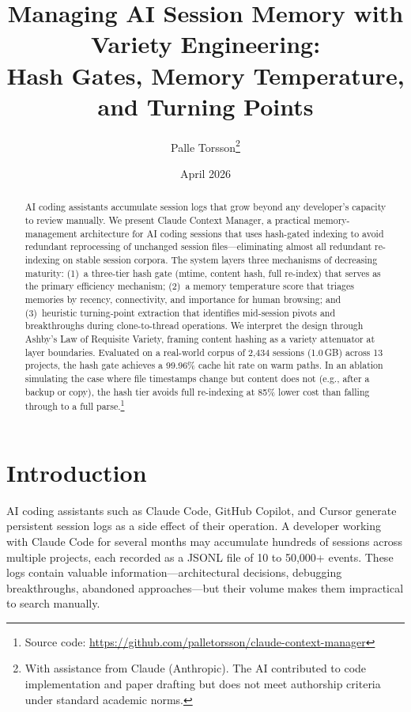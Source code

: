 \documentclass[11pt]{article}
\title{Managing AI Session Memory with Variety Engineering:\\Hash Gates, Memory Temperature, and Turning Points}
\author{
  Palle Torsson\thanks{With assistance from Claude (Anthropic). The AI contributed to code implementation and paper drafting but does not meet authorship criteria under standard academic norms.}
}
\date{April 2026}
\begin{document}
\maketitle

\begin{abstract}
AI coding assistants accumulate session logs that grow beyond any developer's capacity to review manually. We present Claude Context Manager, a practical memory-management architecture for AI coding sessions that uses hash-gated indexing to avoid redundant reprocessing of unchanged session files---eliminating almost all redundant re-indexing on stable session corpora. The system layers three mechanisms of decreasing maturity: (1)~a three-tier hash gate (mtime, content hash, full re-index) that serves as the primary efficiency mechanism; (2)~a memory temperature score that triages memories by recency, connectivity, and importance for human browsing; and (3)~heuristic turning-point extraction that identifies mid-session pivots and breakthroughs during clone-to-thread operations. We interpret the design through Ashby's Law of Requisite Variety, framing content hashing as a variety attenuator at layer boundaries. Evaluated on a real-world corpus of 2,434 sessions (1.0\,GB) across 13 projects, the hash gate achieves a 99.96\% cache hit rate on warm paths. In an ablation simulating the case where file timestamps change but content does not (e.g., after a backup or copy), the hash tier avoids full re-indexing at 85\% lower cost than falling through to a full parse.\footnote{Source code: \url{https://github.com/palletorsson/claude-context-manager}}
\end{abstract}

\section{Introduction}

AI coding assistants such as Claude Code, GitHub Copilot, and Cursor generate persistent session logs as a side effect of their operation. A developer working with Claude Code for several months may accumulate hundreds of sessions across multiple projects, each recorded as a JSONL file of 10 to 50,000+ events. These logs contain valuable information---architectural decisions, debugging breakthroughs, abandoned approaches---but their volume makes them impractical to search manually.
\end{document}
